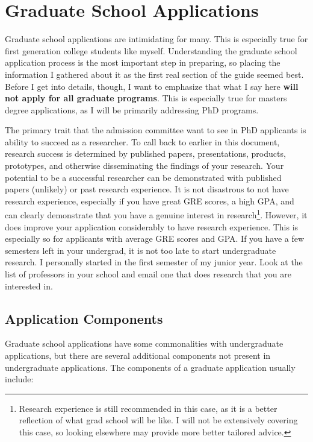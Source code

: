 \documentclass[12pt]{article}
\begin{document}
\section{Graduate School Applications}

Graduate school applications are intimidating for many. This is especially true for first generation college students like myself. Understanding the graduate school application process is the most important step in preparing, so placing the information I gathered about it as the first real section of the guide seemed best. Before I get into details, though, I want to emphasize that what I say here \textbf{will not apply for all graduate programs}. This is especially true for masters degree applications, as I will be primarily addressing PhD programs.

The primary trait that the admission committee want to see in PhD applicants is ability to succeed as a researcher. To call back to earlier in this document, research success is determined by published papers, presentations, products, prototypes, and otherwise disseminating the findings of your research. Your potential to be a successful researcher can be demonstrated with published papers (unlikely) or past research experience. It is not disastrous to not have research experience, especially if you have great GRE scores, a high GPA, and can clearly demonstrate that you have a genuine interest in research\footnote{Research experience is still recommended in this case, as it is a better reflection of what grad school will be like. I will not be extensively covering this case, so looking elsewhere may provide more better tailored advice.}. However, it does improve your application considerably to have research experience. This is especially so for applicants with average GRE scores and GPA. If you have a few semesters left in your undergrad, it is not too late to start undergraduate research. I personally started in the first semester of my junior year. Look at the list of professors in your school and email one that does research that you are interested in.

\subsection{Application Components}

Graduate school applications have some commonalities with undergraduate applications, but there are several additional components not present in undergraduate applications. The components of a graduate application usually include:
\end{document}
